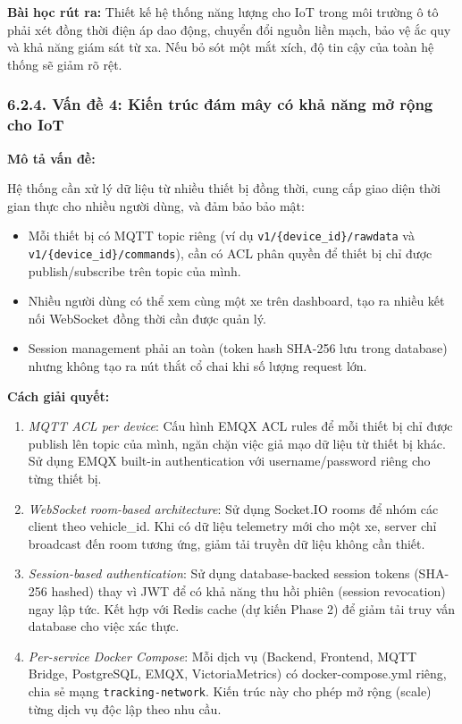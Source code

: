 \documentclass[13pt,a4paper]{extarticle}
\renewcommand{\\}{\thesislongtableorignewline\hline}%
\providecommand{\tightlist}{%
  \setlength{\itemsep}{0pt}\setlength{\parskip}{0pt}}
\begin{document}
\textbf{Bài học rút ra:} Thiết kế hệ thống năng lượng cho IoT trong môi
trường ô tô phải xét đồng thời điện áp dao động, chuyển đổi nguồn liền
mạch, bảo vệ ắc quy và khả năng giám sát từ xa. Nếu bỏ sót một mắt xích,
độ tin cậy của toàn hệ thống sẽ giảm rõ rệt.

\subsubsection{6.2.4. Vấn đề 4: Kiến trúc đám mây có khả năng mở rộng
cho
IoT}\label{624-vux1ea5n-ux111ux1ec1-4-kiux1ebfn-truxfac-ux111uxe1m-muxe2y-cuxf3-khux1ea3-nux103ng-mux1edf-rux1ed9ng-cho-iot}

\textbf{Mô tả vấn đề:}

Hệ thống cần xử lý dữ liệu từ nhiều thiết bị đồng thời, cung cấp giao
diện thời gian thực cho nhiều người dùng, và đảm bảo bảo mật:

\begin{itemize}
\tightlist
\item
  Mỗi thiết bị có MQTT topic riêng (ví dụ
  \texttt{v1/\{device\_id\}/rawdata} và
  \texttt{v1/\{device\_id\}/commands}), cần có ACL phân quyền để thiết
  bị chỉ được publish/subscribe trên topic của mình.
\item
  Nhiều người dùng có thể xem cùng một xe trên dashboard, tạo ra nhiều
  kết nối WebSocket đồng thời cần được quản lý.
\item
  Session management phải an toàn (token hash SHA-256 lưu trong
  database) nhưng không tạo ra nút thắt cổ chai khi số lượng request
  lớn.
\end{itemize}

\textbf{Cách giải quyết:}

\begin{enumerate}
\def\labelenumi{\arabic{enumi}.}
\tightlist
\item
  \emph{MQTT ACL per device}: Cấu hình EMQX ACL rules để mỗi thiết bị
  chỉ được publish lên topic của mình, ngăn chặn việc giả mạo dữ liệu từ
  thiết bị khác. Sử dụng EMQX built-in authentication với
  username/password riêng cho từng thiết bị.
\item
  \emph{WebSocket room-based architecture}: Sử dụng Socket.IO rooms để
  nhóm các client theo vehicle\_id. Khi có dữ liệu telemetry mới cho một
  xe, server chỉ broadcast đến room tương ứng, giảm tải truyền dữ liệu
  không cần thiết.
\item
  \emph{Session-based authentication}: Sử dụng database-backed session
  tokens (SHA-256 hashed) thay vì JWT để có khả năng thu hồi phiên
  (session revocation) ngay lập tức. Kết hợp với Redis cache (dự kiến
  Phase 2) để giảm tải truy vấn database cho việc xác thực.
\item
  \emph{Per-service Docker Compose}: Mỗi dịch vụ (Backend, Frontend,
  MQTT Bridge, PostgreSQL, EMQX, VictoriaMetrics) có docker-compose.yml
  riêng, chia sẻ mạng \texttt{tracking-network}. Kiến trúc này cho phép
  mở rộng (scale) từng dịch vụ độc lập theo nhu cầu.
\end{enumerate}
\end{document}
